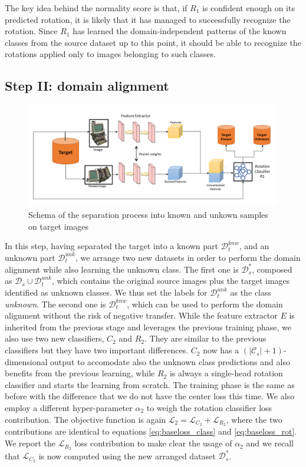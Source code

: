 \documentclass[10pt,twocolumn,letterpaper]{article}
\begin{document}
The key idea behind the normality score is that, if $R_1$ is confident enough on its predicted rotation,
it is likely that it has managed to successfully recognize the rotation.
Since $R_1$ has learned the domain-independent patterns of the known classes from the source dataset up to this point,
it should be able to recognize the rotations applied only to images belonging to such classes.

\subsection{Step II: domain alignment}
\label{sec:domain_alignment}


\begin{figure}[t]
  \includegraphics[trim= 0cm 0cm 0cm 0cm, clip, width=\linewidth ]{scheme.png}
  \caption{\label{fig:separation}\centering Schema of the separation process into known and unkown samples on target images}
\end{figure}


In this step,
having separated the target into a known part $\mathcal{D}_t^{knw}$,
and an unknown part $\mathcal{D}_t^{unk}$,
we arrange two new datasets in order to perform the domain alignment while also learning
the unknown class.
The first one is $\mathcal{D}_s^*$, composed as $\mathcal{D}_s \cup \mathcal{D}_t^{unk}$,
which contains the original source images plus the target images identified as unknown classes.
We thus set the labels for $\mathcal{D}_t^{unk}$ as the class {\it unknown}.
The second one is $\mathcal{D}_t^{knw}$, which can be used to perform the domain alignment
without the risk of negative transfer.
While the feature extractor $E$ is inherited from the previous stage and leverages the previous training phase,
we also use two new classifiers,
$C_2$ and $R_2$.
They are similar to the previous classifiers but they have two important differences.
$C_2$ now has a $(|\mathcal{C}_s|+1)$-dimensional output to accomodate also the unknown class predictions and also
benefits from the previous learning,
while $R_2$ is always a single-head rotation classifier and starts the learning from scratch.
The training phase is the same as before with the difference that we do not have the center loss this time.
We also employ a different hyper-parameter $\alpha_2$ to weigh the rotation classifier loss contribution.
The objective function is again $\mathcal{L}_2 = \mathcal{L}_{C_2} + \mathcal{L}_{R_2}$,
where the two contributions are identical to equations \ref{eq:baseloss_class} and \ref{eq:baseloss_rot}.
We report the $\mathcal{L}_{R_2}$ loss contribution to make clear the usage of $\alpha_2$ and we
recall that $\mathcal{L}_{C_2}$ is now computed using the new arranged dataset $\mathcal{D}_s^*$.
\end{document}
